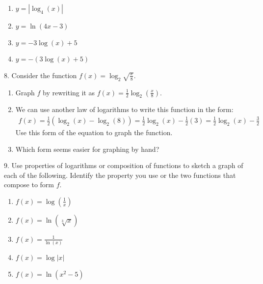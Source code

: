 \documentclass[10pt,]{book}
\theoremstyle{plain}
\theoremstyle{definition}
\theoremstyle{definition}
\theoremstyle{definition}
\numberwithin{equation}{section}
\begin{document}
\begin{exerciselist}
\begin{enumerate}[label=(\alph*)]
\item\hypertarget{li-265}{}\(y = \left| \log_4 \left( x \right) \right|\)%
\item\hypertarget{li-266}{}\(y = \ln \left( 4x - 3 \right)\)%
\item\hypertarget{li-267}{}\(y = -3 \log\left( x \right) + 5\)%
\item\hypertarget{li-268}{}\(y = - \left( 3 \log \left( x \right) + 5 \right)\)%
\end{enumerate}
%
\par\smallskip
\item[8.]\hypertarget{exercise-98}{}\hypertarget{p-364}{}%
Consider the function \(f(x) = \log_2 \sqrt{ \frac{x}{8} }\). \leavevmode%
\begin{enumerate}[label=(\alph*)]
\item\hypertarget{li-269}{}Graph \(f\) by rewriting it as \(f(x) = \frac{1}{2} \log_2 \left( \frac{x}{8} \right)\).%
\item\hypertarget{li-270}{}We can use another law of logarithms to write this function in the form:%
\begin{gather*}
f(x) = \frac{1}{2} \left( \log_2 \left( x \right) - \log_2 \left( 8 \right) \right) = \frac{1}{2} \log_2 \left(x \right) - \frac{1}{2} \left( 3 \right) = \frac{1}{2} \log_2 \left( x \right) - \frac{3}{2}
\end{gather*}
Use this form of the equation to graph the function.%
\item\hypertarget{li-271}{}Which form seems easier for graphing by hand?%
\end{enumerate}
%
\par\smallskip
\item[9.]\hypertarget{exercise-99}{}\hypertarget{p-365}{}%
Use properties of logarithms or composition of functions to sketch a graph of each of the following. Identify the property you use or the two functions that compose to form \(f\). \leavevmode%
\begin{enumerate}[label=(\alph*)]
\item\hypertarget{li-272}{}\(f(x) = \log \left( \frac{1}{x} \right)\)%
\item\hypertarget{li-273}{}\(f(x) = \ln \left( \sqrt[3]{x} \right)\)%
\item\hypertarget{li-274}{}\(f(x) = \frac{1}{\ln \left( x \right)}\)%
\item\hypertarget{li-275}{}\(f(x) = \log \left| x \right|\)%
\item\hypertarget{li-276}{}\(f(x) = \ln \left( x^2 - 5 \right)\)%

\end{enumerate}
\end{exerciselist}
\end{document}
